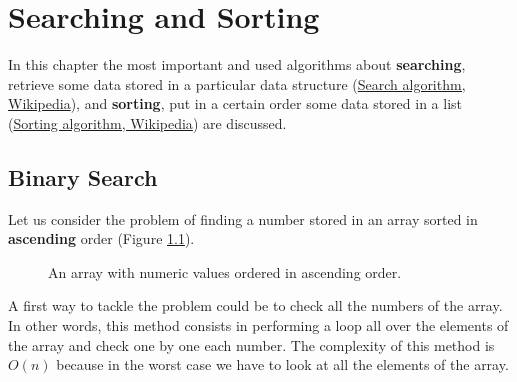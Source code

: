 \chapter{Searching and Sorting}
\label{chp: searchandsorting}
In this chapter the most important and used algorithms about \textbf{searching}, retrieve some data stored in a particular data structure \cite{wikisearch} (\href{https://en.wikipedia.org/wiki/Search_algorithm}{Search algorithm, Wikipedia}), and \textbf{sorting}, put in a certain order some data stored in a list \cite{wikisorting} (\href{https://en.wikipedia.org/wiki/Sorting_algorithm}{Sorting algorithm, Wikipedia}) are discussed.
\section{Binary Search}
Let us consider the problem of finding a number stored in an array sorted in \textbf{ascending} order (Figure \ref{sorting_1}).

\begin{figure}[H]
\centering
{}
\caption[An array with numeric values ordered in ascending order.]{An array with numeric values ordered in ascending order.}
\label{sorting_1}
\end{figure}

A first way to tackle the problem could be to check all the numbers of the array. In other words, this method consists in performing a loop all over the elements of the array and check one by one each number. The complexity of this method is \(O(n)\) because in the worst case we have to look at all the elements of the array. 

